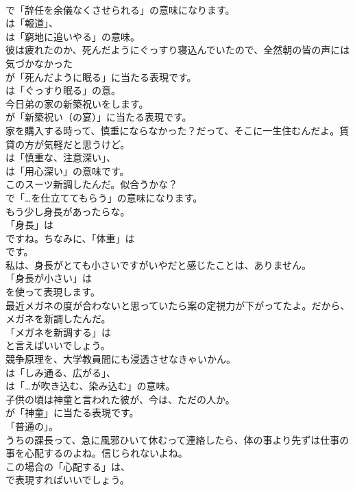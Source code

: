 \documentclass[8pt]{extreport}
\begin{document}
\begin{CJK}{UTF8}{min}
\\	で「辞任を余儀なくさせられる」の意味になります。
\\	は「報道」、
\\	は「窮地に追いやる」の意味。	
\\	彼は疲れたのか、死んだようにぐっすり寝込んでいたので、全然朝の皆の声には気づかなかった 
\\	が「死んだように眠る」に当たる表現です。
\\	は「ぐっすり眠る」の意。	
\\	今日弟の家の新築祝いをします。 
\\	が「新築祝い（の宴）」に当たる表現です。	
\\	家を購入する時って、慎重にならなかった？だって、そこに一生住むんだよ。賃貸の方が気軽だと思うけど。 
\\	は「慎重な、注意深い」、
\\	は「用心深い」の意味です。	
\\	このスーツ新調したんだ。似合うかな？ 
\\	で「…を仕立ててもらう」の意味になります。	
\\	もう少し身長があったらな。 
\\	「身長」は
\\	ですね。ちなみに、「体重」は
\\	です。	
\\	私は、身長がとても小さいですがいやだと感じたことは、ありません。 
\\	「身長が小さい」は
\\	を使って表現します。	
\\	最近メガネの度が合わないと思っていたら案の定視力が下がってたよ。だから、メガネを新調したんだ。 
\\	「メガネを新調する」は
\\	と言えばいいでしょう。	
\\	競争原理を、大学教員間にも浸透させなきゃいかん。 
\\	は「しみ通る、広がる」、
\\	は「…が吹き込む、染み込む」の意味。	
\\	子供の頃は神童と言われた彼が、今は、ただの人か。 
\\	が「神童」に当たる表現です。
\\	「普通の」。	
\\	うちの課長って、急に風邪ひいて休むって連絡したら、体の事より先ずは仕事の事を心配するのよね。信じられないよね。 
\\	この場合の「心配する」は、
\\	で表現すればいいでしょう。

\end{CJK}
\end{document}
